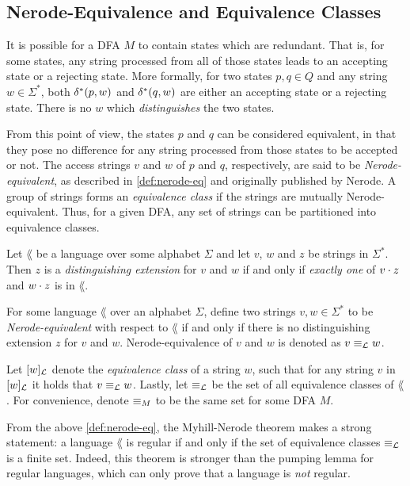 \subsection{Nerode-Equivalence and Equivalence Classes}
\label{sec:nerode-equiv-equiv}
It is possible for a DFA $M$ to contain states which are redundant. That is, for
some states, any string processed from all of those states leads to an accepting
state or a rejecting state. More formally, for two states $p,q \in Q$ and any
string $w \in \Sigma^*$, both $\delta^*(p,w)$ and $\delta^*(q,w)$ are either an
accepting state or a rejecting state. There is no $w$ which
\textit{distinguishes} the two states.

From this point of view, the states $p$ and $q$ can be considered equivalent, in
that they pose no difference for any string processed from those states to be
accepted or not. The access strings $v$ and $w$ of $p$ and $q$, respectively,
are said to be \textit{Nerode-equivalent}, as described in \cref{def:nerode-eq}
and originally published by Nerode\cite{Nerode1958}. A group of strings forms an
\textit{equivalence class} if the strings are mutually Nerode-equivalent. Thus,
for a given DFA, any set of strings can be partitioned into equivalence classes.

\begin{definition}\label{def:dist-ext}
  Let $\lang$ be a language over some alphabet $\Sigma$ and let $v$, $w$ and
  $z$ be strings in $\Sigma^*$. Then $z$ is a \textit{distinguishing extension}
  for $v$ and $w$ if and only if \textit{exactly one} of $v \cdot z$ and
  $w \cdot z$ is in $\lang$.
\end{definition}
\begin{definition}\label{def:nerode-eq}
  For some language $\lang$ over an alphabet $\Sigma$, define two strings
  $v,w \in \Sigma^*$ to be \textit{Nerode-equivalent} with respect to $\lang$ if
  and only if there is no distinguishing extension $z$ for $v$ and $w$.
  Nerode-equivalence of $v$ and $w$ is denoted as $v \equiv_{\mathcal{L}} w$.

  Let $[w]_{\mathcal{L}}$ denote the \textit{equivalence class} of a string
  $w$, such that for any string $v$ in $[w]_{\mathcal{L}}$ it holds that
  $v \equiv_{\mathcal{L}} w$. Lastly, let $\equiv_{\mathcal{L}}$ be the set of all equivalence
  classes of $\lang$. For convenience, denote $\equiv_M$ to be the same set for
  some DFA $M$.
\end{definition}

From the above \cref{def:nerode-eq}, the Myhill-Nerode theorem makes a strong
statement: a language $\lang$ is regular if and only if the set of equivalence
classes $\equiv_{\mathcal{L}}$ is a finite set. Indeed, this theorem is stronger than the
pumping lemma for regular languages, which can only prove that a language is
\textit{not} regular.

